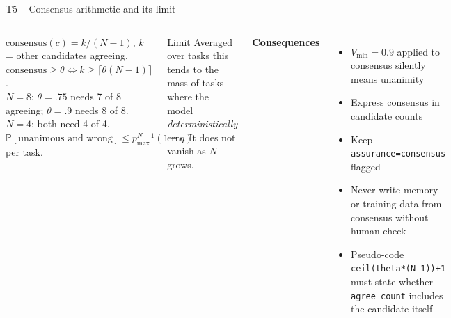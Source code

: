 \documentclass[aspectratio=169,10pt]{beamer}
\renewcommand{\Pr}{\mathbb{P}}
\begin{document}
\begin{frame}{T5 -- Consensus arithmetic and its limit}
\begin{columns}[T]
\begin{theorem}[T5]\small
$\text{consensus}(c)=k/(N{-}1)$, $k$ = other candidates agreeing. $\text{consensus}\ge\theta\iff k\ge\lceil\theta(N{-}1)\rceil$.\\
$N{=}8$: $\theta{=}.75$ needs 7 of 8 agreeing; $\theta{=}.9$ needs 8 of 8. $N{=}4$: both need 4 of 4.\\
$\Pr[\text{unanimous and wrong}]\le p_{\max}^{N-1}(1-q)$ per task.
\end{theorem}
\begin{alertblock}{Limit}
\small Averaged over tasks this tends to the mass of tasks where the model \emph{deterministically} errs. It does not vanish as $N$ grows.
\end{alertblock}
\small
\textbf{Consequences}
\begin{itemize}
\item $V_{\min}{=}0.9$ applied to consensus silently means unanimity
\item Express consensus in candidate counts
\item Keep \texttt{assurance=consensus} flagged
\item Never write memory or training data from consensus without human check
\item Pseudo-code \texttt{ceil(theta*(N-1))+1} must state whether \texttt{agree\_count} includes the candidate itself
\end{itemize}
\end{columns}
\end{frame}
\end{document}
